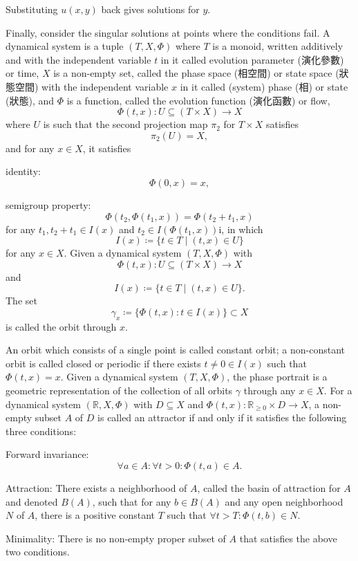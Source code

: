 \documentclass[a4paper,12pt]{report}
\begin{document}
Substituting $u(x,y)$ back gives solutions for $y$.

Finally, consider the singular solutions at points where the conditions fail.
A dynamical system is a tuple $(T, X, \Phi)$ where $T$ is a monoid, written additively and with the independent variable $t$ in it called evolution parameter (演化參數) or time, $X$ is a non-empty set, called the phase space (相空間) or state space (狀態空間) with the independent variable $x$ in it called (system) phase (相) or state (狀態), and $\Phi$ is a function, called the evolution function (演化函數) or flow,
\[\Phi(t,x)\colon U\subseteq(T\times X)\to X\]
where $U$ is such that the second projection map $\pi_2$ for $T\times X$ satisfies
\[\pi_2(U)=X,\]
and for any $x \in X$, it satisfies
\bit
\item identity:
\[\Phi (0,x)=x,\]
\item semigroup property:
\[\Phi (t_{2},\Phi (t_{1},x))=\Phi (t_{2}+t_{1},x)\]
for any $t_{1},t_{2}+t_{1}\in I(x)$ and $t_{2}\in I(\Phi (t_{1},x))$i, in which
\[I(x)\coloneq\{t\in T\mid(t,x)\in U\}\]
for any $x\in X$.
\eit
{}
Given a dynamical system $(T, X, \Phi)$ with
\[\Phi(t,x)\colon U\subseteq(T\times X)\to X\]
and
\[I(x)\coloneq\{t\in T\mid(t,x)\in U\}.\]
The set
\[\gamma _{x}\coloneq\{\Phi (t,x)\colon t\in I(x)\}\subset X\]
is called the orbit through $x$.

An orbit which consists of a single point is called constant orbit; a non-constant orbit is called closed or periodic if there exists $t\neq 0\in I(x)$ such that $\Phi (t,x)=x$.
Given a dynamical system $(T, X, \Phi)$, the phase portrait is a geometric representation of the collection of all orbits $\gamma$ through any $x\in X$.
For a dynamical system $(\mathbb{R}, X, \Phi)$ with $D\subseteq X$ and $\Phi(t,x)\colon \mathbb{R}_{\geq 0}\times D\to X$, a non-empty subset $A$ of $D$ is called an attractor if and only if it satisfies the following three conditions:
\bit
\item Forward invariance:
    \[\forall a\in A\colon\forall t>0\colon\Phi(t,a)\in A.\]
\item Attraction: There exists a neighborhood of $A$, called the basin of attraction for $A$ and denoted $B(A)$, such that for any $b\in B(A)$ and any open neighborhood $N$ of $A$, there is a positive constant $T$ such that $\forall t>T\colon\Phi(t,b)\in N$.
\item Minimality: There is no non-empty proper subset of $A$ that satisfies the above two conditions.
\eit
\end{document}
